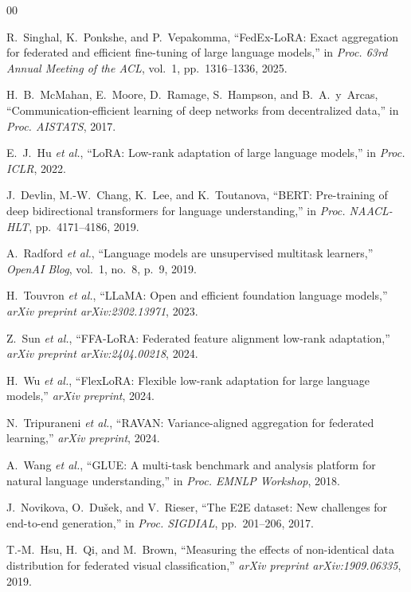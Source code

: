 \documentclass[conference]{IEEEtran}
\begin{document}
\begin{thebibliography}{00}

R.~Singhal, K.~Ponkshe, and P.~Vepakomma,
``FedEx-LoRA: Exact aggregation for federated and efficient fine-tuning of
large language models,''
in \textit{Proc. 63rd Annual Meeting of the ACL}, vol.~1,
pp.~1316--1336, 2025.

H.~B.~McMahan, E.~Moore, D.~Ramage, S.~Hampson, and B.~A.~y~Arcas,
``Communication-efficient learning of deep networks from decentralized data,''
in \textit{Proc. AISTATS}, 2017.

E.~J.~Hu \emph{et al.},
``LoRA: Low-rank adaptation of large language models,''
in \textit{Proc. ICLR}, 2022.

J.~Devlin, M.-W.~Chang, K.~Lee, and K.~Toutanova,
``BERT: Pre-training of deep bidirectional transformers for language
understanding,''
in \textit{Proc. NAACL-HLT}, pp.~4171--4186, 2019.

A.~Radford \emph{et al.},
``Language models are unsupervised multitask learners,''
\textit{OpenAI Blog}, vol.~1, no.~8, p.~9, 2019.

H.~Touvron \emph{et al.},
``LLaMA: Open and efficient foundation language models,''
\textit{arXiv preprint arXiv:2302.13971}, 2023.

Z.~Sun \emph{et al.},
``FFA-LoRA: Federated feature alignment low-rank adaptation,''
\textit{arXiv preprint arXiv:2404.00218}, 2024.

H.~Wu \emph{et al.},
``FlexLoRA: Flexible low-rank adaptation for large language models,''
\textit{arXiv preprint}, 2024.

N.~Tripuraneni \emph{et al.},
``RAVAN: Variance-aligned aggregation for federated learning,''
\textit{arXiv preprint}, 2024.

A.~Wang \emph{et al.},
``GLUE: A multi-task benchmark and analysis platform for natural language
understanding,''
in \textit{Proc. EMNLP Workshop}, 2018.

J.~Novikova, O.~Du\v{s}ek, and V.~Rieser,
``The E2E dataset: New challenges for end-to-end generation,''
in \textit{Proc. SIGDIAL}, pp.~201--206, 2017.

T.-M.~Hsu, H.~Qi, and M.~Brown,
``Measuring the effects of non-identical data distribution for federated
visual classification,''
\textit{arXiv preprint arXiv:1909.06335}, 2019.

\end{thebibliography}
\end{document}
